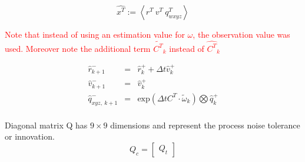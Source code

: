 \documentclass[letterpaper, 10 pt, conference]{ieeeconf}  %
\newcommand{\transpose}[1]{\ensuremath{#1^{\scriptscriptstyle T}}}
\begin{document}
\begin{equation}
  \hat{\transpose{x}} :=  \left<\transpose{r}~\transpose{v}~\transpose{q_{wxyz}} \right>
\end{equation}

\textcolor{red}{Note that instead of using an estimation value for \(\omega\), the observation
value was used. Moreover note the additional term \(\tilde{\transpose{C}}_{k} \) instead of
\(\hat{\transpose{C}}_{k} \)}

\begin{equation}
  \begin{array}{lll}
    \hat{r}_{k+1}^{-} &  = & \hat{r}^{+}_{k} + \Delta t \hat{v}^{+}_{k} \\
    \hat{v}_{k+1}^{-} &  = & \hat{v}^{+}_{k} \\
    \hat{q}_{xyz,~k+1}^{-} &  = & \text{exp}\left(\Delta t \transpose{C} \cdot \tilde{\omega}_{k} \right)  \bigotimes \hat{q}_{k}^{+}\\
  \end{array}
\end{equation}














Diagonal matrix Q has \( 9 \times 9\) dimensions and represent the process
noise tolerance or innovation.
\begin{equation}
Q_{c} =
        \begin{bmatrix}
                Q_{t}
        \end{bmatrix}
\end{equation}
\end{document}

